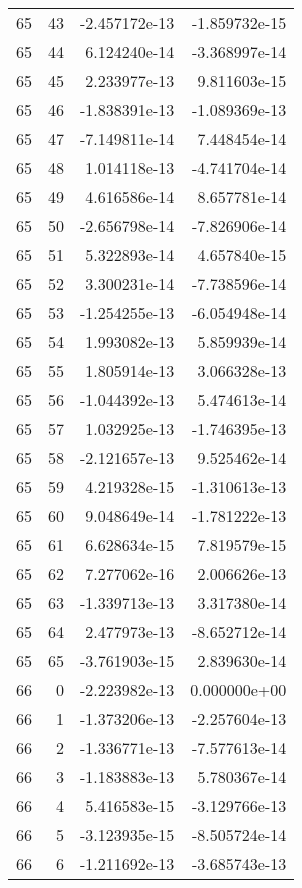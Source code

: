 \begin{tabular}{rrrr}
  65 &   43 & -2.457172e-13 & -1.859732e-15 \\
  65 &   44 &  6.124240e-14 & -3.368997e-14 \\
  65 &   45 &  2.233977e-13 &  9.811603e-15 \\
  65 &   46 & -1.838391e-13 & -1.089369e-13 \\
  65 &   47 & -7.149811e-14 &  7.448454e-14 \\
  65 &   48 &  1.014118e-13 & -4.741704e-14 \\
  65 &   49 &  4.616586e-14 &  8.657781e-14 \\
  65 &   50 & -2.656798e-14 & -7.826906e-14 \\
  65 &   51 &  5.322893e-14 &  4.657840e-15 \\
  65 &   52 &  3.300231e-14 & -7.738596e-14 \\
  65 &   53 & -1.254255e-13 & -6.054948e-14 \\
  65 &   54 &  1.993082e-13 &  5.859939e-14 \\
  65 &   55 &  1.805914e-13 &  3.066328e-13 \\
  65 &   56 & -1.044392e-13 &  5.474613e-14 \\
  65 &   57 &  1.032925e-13 & -1.746395e-13 \\
  65 &   58 & -2.121657e-13 &  9.525462e-14 \\
  65 &   59 &  4.219328e-15 & -1.310613e-13 \\
  65 &   60 &  9.048649e-14 & -1.781222e-13 \\
  65 &   61 &  6.628634e-15 &  7.819579e-15 \\
  65 &   62 &  7.277062e-16 &  2.006626e-13 \\
  65 &   63 & -1.339713e-13 &  3.317380e-14 \\
  65 &   64 &  2.477973e-13 & -8.652712e-14 \\
  65 &   65 & -3.761903e-15 &  2.839630e-14 \\
  66 &    0 & -2.223982e-13 &  0.000000e+00 \\
  66 &    1 & -1.373206e-13 & -2.257604e-13 \\
  66 &    2 & -1.336771e-13 & -7.577613e-14 \\
  66 &    3 & -1.183883e-13 &  5.780367e-14 \\
  66 &    4 &  5.416583e-15 & -3.129766e-13 \\
  66 &    5 & -3.123935e-15 & -8.505724e-14 \\
  66 &    6 & -1.211692e-13 & -3.685743e-13 \\

\end{tabular}
